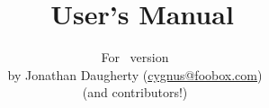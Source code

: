 \title{\vtyui\ User's Manual}
\author{
  For \vtyui\ version \vtyuiversion\\
  by Jonathan Daugherty (\href{mailto:cygnus@foobox.com}{cygnus@foobox.com})\\
  (and contributors!)
}
\maketitle
